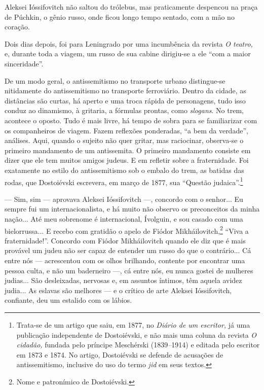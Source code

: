 Aleksei Ióssifovitch não saltou do trólebus, mas praticamente despencou
na praça de Púchkin, o gênio russo, onde ficou longo tempo sentado, com
a mão no coração.

Dois dias depois, foi para Leningrado por uma incumbência da revista
\emph{O teatro,} e, durante toda a viagem, um russo de sua cabine
dirigiu-se a ele ``com a maior sinceridade''.

De um modo geral, o antissemitismo no transporte urbano distingue-se
nitidamente do antissemitismo no transporte ferroviário. Dentro da
cidade, as distâncias são curtas, há aperto e uma troca rápida de
personagens, tudo isso conduz ao dinamismo, à gritaria, a fórmulas
prontas, como \emph{slogans}. No trem, acontece o oposto. Tudo é mais
livre, há tempo de sobra para se familiarizar com os companheiros de
viagem. Fazem reflexões ponderadas, ``a bem da verdade'', análises.
Aqui, quando o sujeito não quer gritar, mas raciocinar, observa-se o
primeiro mandamento de um antissemita. O primeiro mandamento consiste em
dizer que ele tem muitos amigos judeus. E em refletir sobre a
fraternidade. Foi exatamente no estilo do antissemitismo sob o embalo do
trem, as batidas das rodas, que Dostoiévski escrevera, em março de 1877,
sua ``Questão judaica''.\footnote{Trata-se de um artigo que saiu, em
  1877, no \emph{Diário de um escritor,} já uma publicação independente
  de Dostoiévski, e não mais uma coluna da revista \emph{O cidadão,}
  fundada pelo príncipe Meschérski (1839\emph{--}1914) e editada pelo
  escritor em 1873 e 1874. No artigo, Dostoiévski se defende de
  acusações de antissemitismo, inclusive do uso do termo \emph{jid} em
  seus textos.}

--- Sim, sim --- aprovava Aleksei Ióssifovitch ---, concordo com o
senhor... Eu sempre fui um internacionalista, e há muito não observo os
preconceitos da minha nação... Até meu sobrenome é internacional,
Ívolguin, e sou casado com uma bielorrussa... E recebo com gratidão o
apelo de Fiódor Mikháilovitch,\footnote{Nome e patronímico de
  Dostoiévski.} ``Viva a fraternidade!''. Concordo com Fiódor
Mikháilovitch quando ele diz que é mais provável um judeu não ser capaz
de entender um russo do que o contrário... Cá entre nós --- acrescentou
com os olhos brilhando, contente por encontrar uma pessoa culta, e não
um baderneiro ---, cá entre nós, eu nunca gostei de mulheres judias...
São desleixadas, nervosas e, em assuntos íntimos, têm aquela avidez
judia... As eslavas são melhores --- e o crítico de arte Aleksei
Ióssifovitch, confiante, deu um estalido com os lábios.

